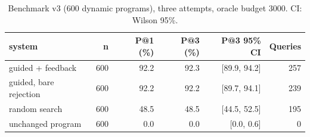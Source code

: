 \begin{table}[t]
\centering
\caption{Benchmark v3 (600 dynamic programs), three attempts, oracle budget 3000. CI: Wilson 95\%.}
\label{tab:v3rates}
\footnotesize
\setlength{\tabcolsep}{3pt}
\begin{tabular}{lrrrrr}
\toprule
system & n & P@1 (\%) & P@3 (\%) & P@3 95\% CI & Queries \\
\midrule
guided + feedback & 600 & 92.2 & 92.3 & [89.9, 94.2] & 257 \\
guided, bare rejection & 600 & 92.2 & 92.2 & [89.7, 94.1] & 239 \\
random search & 600 & 48.5 & 48.5 & [44.5, 52.5] & 195 \\
unchanged program & 600 & 0.0 & 0.0 & [0.0, 0.6] & 0 \\
\bottomrule
\end{tabular}
\end{table}
